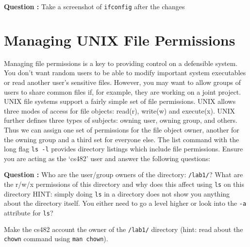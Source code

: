 \documentclass{article}
\begin{document}
\textbf{Question :} Take a screenshot of {\tt ifconfig} after the changes\medskip
\addtocounter{Question}{1}

\section{Managing UNIX File Permissions}

Managing file permissions is a key to providing control on a defensible system. You don't want random users to be able to modify important system executables or read another user’s sensitive files. However, you may want to allow groups of users to share common files if, for example, they are working on a joint project. UNIX file systems support a fairly simple set of file permissions. UNIX allows three modes of access for file objects: read(r), write(w) and execute(x). UNIX further defines three types of subjects: owning user, owning group, and others. Thus we can assign one set of permissions for the file object owner, another for the owning group and a third set for everyone else. The list command with the long flag {\tt ls -l} provides directory listings which include file permissions.  Ensure you are acting as the ‘cs482’ user and answer the following questions:

\textbf{Question :} Who are the user/group owners of the directory: {\tt /lab1/}? What are the r/w/x permissions of this directory and why does this affect using {\tt ls} on this directory HINT: simply doing {\tt ls} in a directory does not show you anything about the directory itself. You either need to go a level higher or look into the {\tt -a} attribute for {\tt ls}?\medskip
\addtocounter{Question}{1}

Make the cs482 account the owner of the {\tt /lab1/} directory (hint: read about the {\tt chown} command using {\tt man chown}).\medskip
\end{document}
